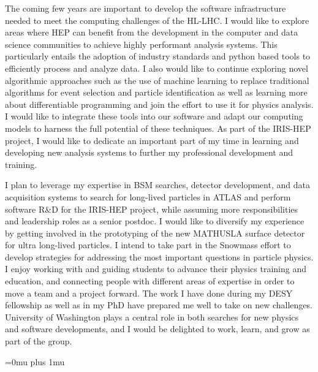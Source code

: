 \documentclass[a4paper]{article}
\begin{document}
\bigskip

The coming few years are important to develop the software infrastructure needed to meet the computing challenges of the HL-LHC. I would like to explore areas where HEP can benefit from the development in the computer and data science communities to achieve highly performant analysis systems. This particularly entails the adoption of  industry standards and python based tools to efficiently process and analyze data. I also would like to continue exploring novel algorithmic approaches such as the use of machine learning to replace traditional algorithms for event selection and particle identification as well as learning more about differentiable programming and join the effort to use it for physics analysis. I would like to integrate these tools into our software and adapt our computing models to harness the full potential of these techniques. As part of the IRIS-HEP project, I would like to dedicate an important part of my time in learning and developing new analysis systems to further my professional development and training.

\bigskip

I plan to leverage my expertise in BSM searches, detector development, and data acquisition systems to search for long-lived particles in ATLAS and perform software R\&D for the IRIS-HEP project, while assuming more responsibilities and leadership roles as a senior postdoc. I would like to diversify my experience by getting involved in the prototyping of the new MATHUSLA surface detector for ultra long-lived particles. I intend to take part in the Snowmass effort to develop strategies for addressing the most important questions in particle physics. I enjoy working with and guiding students to advance their physics training and education, and connecting people with different areas of expertise in order to move a team and a project forward. The work I have done during my DESY fellowship as well as in my PhD have prepared me well to take on new challenges. University of Washington plays a central role in both searches for new physics and software developments, and I would be delighted to work, learn, and grow as part of the group.





\Urlmuskip=0mu plus 1mu\relax
{%
\fontsize{11}{14}
\selectfont
}{}

\end{document}
